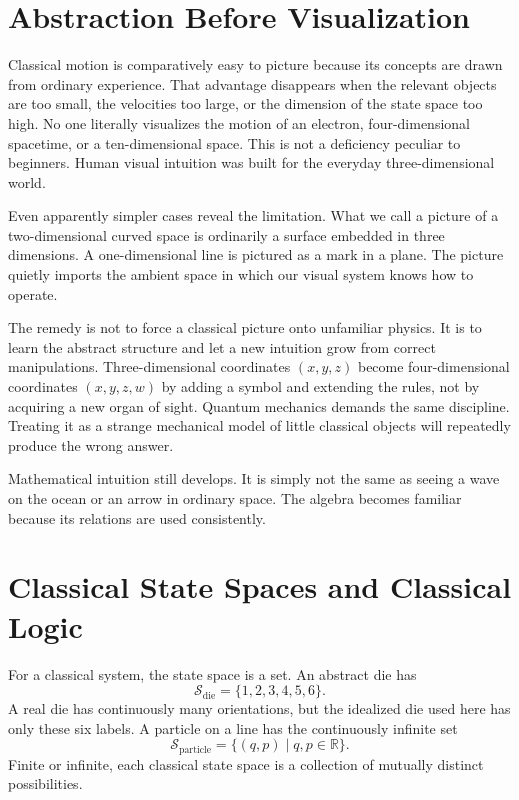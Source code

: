 \section{Abstraction Before Visualization}

Classical motion is comparatively easy to picture because its concepts are drawn from ordinary experience. That advantage disappears when the relevant objects are too small, the velocities too large, or the dimension of the state space too high. No one literally visualizes the motion of an electron, four-dimensional spacetime, or a ten-dimensional space. This is not a deficiency peculiar to beginners. Human visual intuition was built for the everyday three-dimensional world.

Even apparently simpler cases reveal the limitation. What we call a picture of a two-dimensional curved space is ordinarily a surface embedded in three dimensions. A one-dimensional line is pictured as a mark in a plane. The picture quietly imports the ambient space in which our visual system knows how to operate.

The remedy is not to force a classical picture onto unfamiliar physics. It is to learn the abstract structure and let a new intuition grow from correct manipulations. Three-dimensional coordinates \((x,y,z)\) become four-dimensional coordinates \((x,y,z,w)\) by adding a symbol and extending the rules, not by acquiring a new organ of sight. Quantum mechanics demands the same discipline. Treating it as a strange mechanical model of little classical objects will repeatedly produce the wrong answer.

\begin{remark}
Mathematical intuition still develops. It is simply not the same as seeing a wave on the ocean or an arrow in ordinary space. The algebra becomes familiar because its relations are used consistently.
\end{remark}

\section{Classical State Spaces and Classical Logic}

For a classical system, the state space is a set. An abstract die has
\begin{equation}
  \mathcal S_{\mathrm{die}}=\{1,2,3,4,5,6\}.
\end{equation}
A real die has continuously many orientations, but the idealized die used here has only these six labels. A particle on a line has the continuously infinite set
\begin{equation}
  \mathcal S_{\mathrm{particle}}
  =
  \{(q,p)\mid q,p\in\mathbb R\}.
\end{equation}
Finite or infinite, each classical state space is a collection of mutually distinct possibilities.

